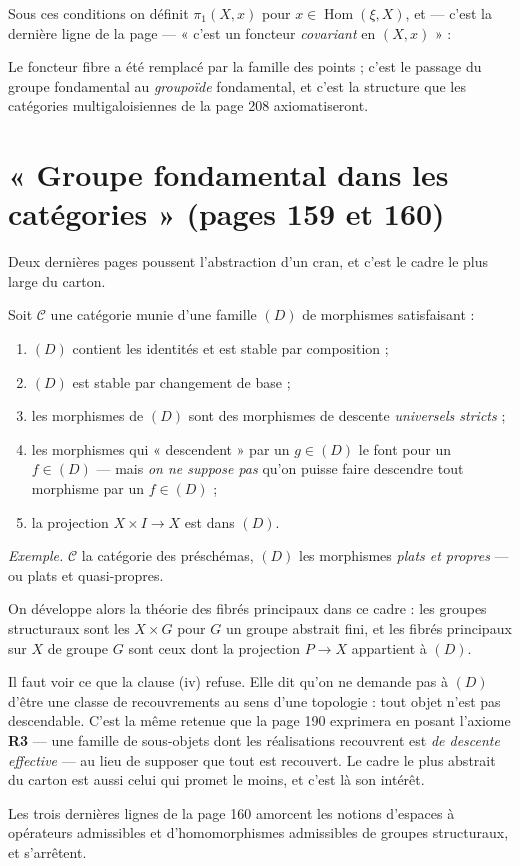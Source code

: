 \documentclass[11pt,a4paper]{article}
\begin{document}
Sous ces conditions on définit $\pi_{1}(X, x)$ pour $x \in
\operatorname{Hom}(\xi, X)$, et --- c'est la dernière ligne de la page ---
« c'est un foncteur \emph{covariant} en $(X, x)$ » :


Le foncteur fibre a été remplacé par la famille des points ; c'est le passage
du groupe fondamental au \emph{groupoïde} fondamental, et c'est la structure
que les catégories multigaloisiennes de la page 208 axiomatiseront.

\section*{« Groupe fondamental dans les catégories » (pages 159 et 160)}

Deux dernières pages poussent l'abstraction d'un cran, et c'est le cadre le
plus large du carton.

Soit $\mathcal{C}$ une catégorie munie d'une famille $(D)$ de morphismes
satisfaisant :

\begin{enumerate}
  \item[(i)] $(D)$ contient les identités et est stable par composition ;
  \item[(ii)] $(D)$ est stable par changement de base ;
  \item[(iii)] les morphismes de $(D)$ sont des morphismes de descente
    \emph{universels stricts} ;
  \item[(iv)] les morphismes qui « descendent » par un $g \in (D)$ le font pour
    un $f \in (D)$ --- mais \emph{on ne suppose pas} qu'on puisse faire
    descendre tout morphisme par un $f \in (D)$ ;
  \item[(v)] la projection $X \times I \to X$ est dans $(D)$.
\end{enumerate}

\emph{Exemple.} $\mathcal{C}$ la catégorie des préschémas, $(D)$ les morphismes
\emph{plats et propres} --- ou plats et quasi-propres.

On développe alors la théorie des fibrés principaux dans ce cadre : les groupes
structuraux sont les $X \times G$ pour $G$ un groupe abstrait fini, et les
fibrés principaux sur $X$ de groupe $G$ sont ceux dont la projection
$P \to X$ appartient à $(D)$.

Il faut voir ce que la clause (iv) refuse. Elle dit qu'on ne demande pas à
$(D)$ d'être une classe de recouvrements au sens d'une topologie : tout objet
n'est pas descendable. C'est la même retenue que la page 190 exprimera en
posant l'axiome \textbf{R3} --- une famille de sous-objets dont les
réalisations recouvrent est \emph{de descente effective} --- au lieu de
supposer que tout est recouvert. Le cadre le plus abstrait du carton est aussi
celui qui promet le moins, et c'est là son intérêt.

Les trois dernières lignes de la page 160 amorcent les notions d'espaces à
opérateurs admissibles et d'homomorphismes admissibles de groupes structuraux,
et s'arrêtent.
\end{document}
